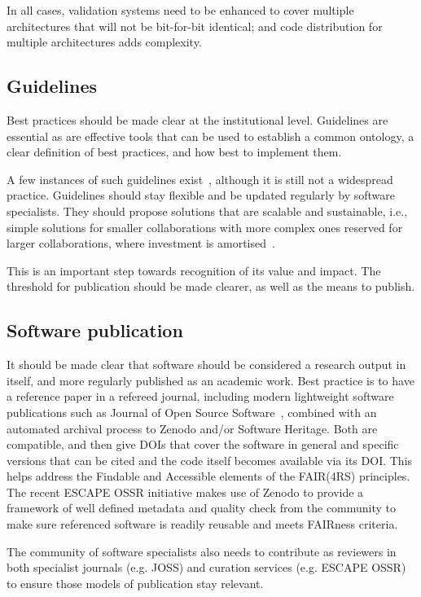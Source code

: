 In all cases, validation systems need to be enhanced to cover multiple architectures that will not be bit-for-bit identical; and code distribution for multiple architectures adds complexity.

\subsection{Guidelines}

Best practices should be made clear at the institutional level. Guidelines are essential as are effective tools that can be used to establish a common ontology, a clear definition of best practices, and how best to implement them. 

A few instances of such guidelines exist~\cite{RSQkit}, although it is still not a widespread practice. Guidelines should stay flexible and be updated regularly by software specialists. They should propose solutions that are scalable and sustainable, i.e., simple solutions for smaller collaborations with more complex ones reserved for larger collaborations, where investment is amortised~\cite{australian_research_data_commons_2022_6378082}.

This is an important step towards recognition of its value and impact. The threshold for publication should be made clearer, as well as the means to publish.


\subsection{Software publication}

It should be made clear that software should be considered a research output in itself, and more regularly published as an academic work. Best practice is to have a reference paper in a refereed journal, including modern lightweight software publications such as Journal of Open Source Software~\cite{JOSS}, combined with an automated archival process to Zenodo and/or Software Heritage. Both are compatible, and then give DOIs that cover the software in general and specific versions that can be cited and the code itself becomes available via its DOI. This helps address the Findable and Accessible elements of the FAIR(4RS) principles. The recent ESCAPE OSSR initiative makes use of Zenodo to provide a framework of well defined metadata and quality check from the community to make sure referenced software is readily reusable and meets FAIRness criteria.

The community of software specialists also needs to contribute as reviewers in both specialist journals (e.g. JOSS) and curation services (e.g. ESCAPE OSSR) to ensure those models of publication stay relevant.


